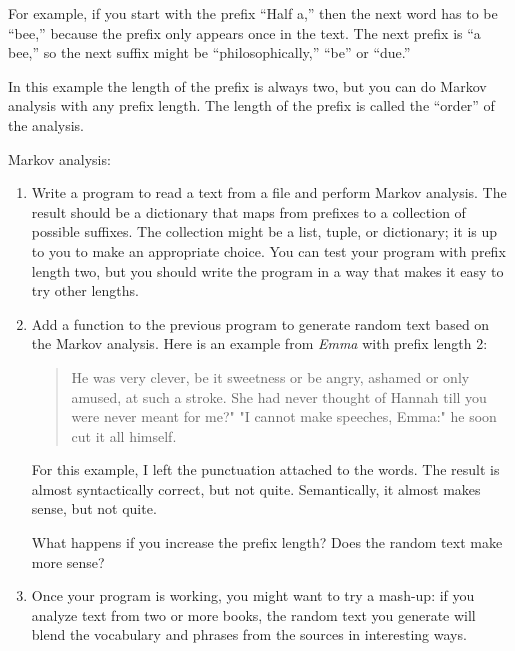 \documentclass[10pt]{book}
\begin{document}
For example, if you start with the prefix ``Half a,'' then the
next word has to be ``bee,'' because the prefix only appears
once in the text.  The next prefix is ``a bee,'' so the
next suffix might be ``philosophically,'' ``be'' or ``due.''

In this example the length of the prefix is always two, but
you can do Markov analysis with any prefix length.  The length
of the prefix is called the ``order'' of the analysis.

\begin{ex}
Markov analysis:

\begin{enumerate}

\item Write a program to read a text from a file and perform Markov
analysis.  The result should be a dictionary that maps from
prefixes to a collection of possible suffixes.  The collection
might be a list, tuple, or dictionary; it is up to you to make
an appropriate choice.  You can test your program with prefix
length two, but you should write the program in a way that makes
it easy to try other lengths.

\item Add a function to the previous program to generate random text
based on the Markov analysis.  Here is an example from {\em Emma}
with prefix length 2:

\begin{quote}
He was very clever, be it sweetness or be angry, ashamed or only
amused, at such a stroke. She had never thought of Hannah till you
were never meant for me?" "I cannot make speeches, Emma:" he soon cut
it all himself.
\end{quote}

For this example, I left the punctuation attached to the words.
The result is almost syntactically correct, but not quite.
Semantically, it almost makes sense, but not quite.

What happens if you increase the prefix length?  Does the random
text make more sense?


\item Once your program is working, you might want to try a mash-up:
if you analyze text from two or more books, the random
text you generate will blend the vocabulary and phrases from
the sources in interesting ways.

\end{enumerate}
\end{ex}
\end{document}
